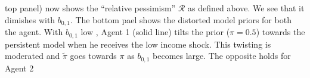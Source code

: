 \documentclass[12pt]{article}
\begin{document}
%
top panel) now shows the ``relative pessimism'' $\mathcal{R}$ as defined above. We see that it dimishes with $b_{0,1}$. The bottom pael shows the distorted model priors for both the agent.  With $b_{0,1}$ low , Agent 1 (solid line) tilts the prior ($\pi=0.5$) towards the persistent model when he receives the low income shock. This twisting is moderated and $\tilde{\pi}$ goes towards $\pi$ as $b_{0,1}$ becomes large. The opposite holds for Agent 2
%
%
%
\end{document}
